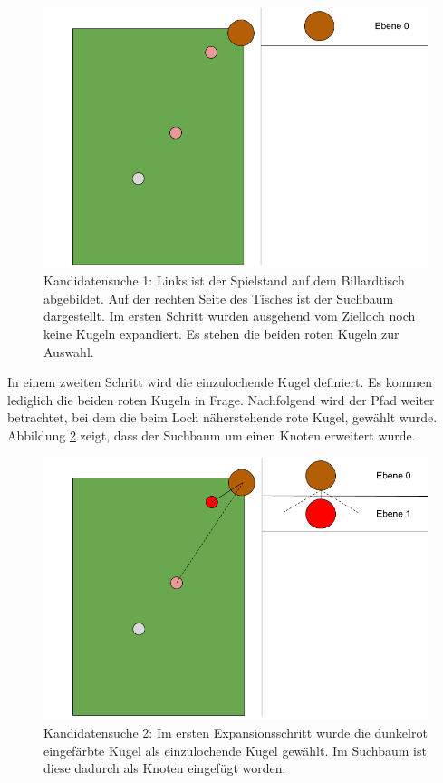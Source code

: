 \begin{figure}[h!]
    \begin{center}
        \includegraphics[width=0.5\linewidth]{../common/03_billiard_ai/resources/11_backwardsearch_1.png}
    \end{center}
    \caption{Kandidatensuche 1: Links ist der Spielstand auf dem Billardtisch abgebildet. Auf der rechten Seite des Tisches ist der Suchbaum dargestellt.
    Im ersten Schritt wurden ausgehend vom Zielloch noch keine Kugeln expandiert.
    Es stehen die beiden roten Kugeln zur Auswahl.}
    \label{fig:backwardsearch_1}
\end{figure}

In einem zweiten Schritt wird die einzulochende Kugel definiert. Es kommen lediglich die beiden roten Kugeln in Frage.
Nachfolgend wird der Pfad weiter betrachtet, bei dem die beim Loch näherstehende rote Kugel, gewählt wurde.
Abbildung \ref{fig:backwardsearch_2} zeigt, dass der Suchbaum um einen Knoten erweitert wurde.
\begin{figure}[h!]
    \begin{center}
        \includegraphics[width=0.5\linewidth]{../common/03_billiard_ai/resources/12_backwardsearch_2.png}
    \end{center}
    \caption{Kandidatensuche 2: Im ersten Expansionsschritt wurde die dunkelrot eingefärbte Kugel als einzulochende Kugel gewählt.
    Im Suchbaum ist diese dadurch als Knoten eingefügt worden. }
    \label{fig:backwardsearch_2}
\end{figure}

